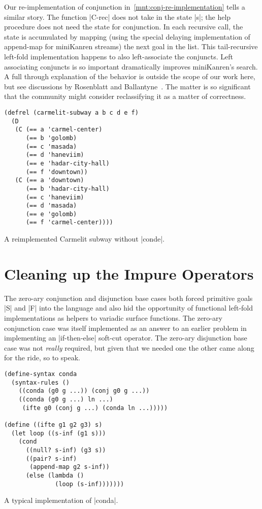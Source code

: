 \documentclass[sigplan,screen,draft,anonymous,review,natbib=false]{acmart}
\begin{document}
Our re-implementation of conjunction
in~\cref{mnt:conj-re-implementation} tells a similar story. The
function \rackinline|C-rec| does not take in the state \rackinline|s|;
the help procedure does not need the state for conjunction. In each
recursive call, the state is accumulated by mapping (using the special
delaying implementation of append-map for miniKanren streams) the next
goal in the list. This tail-recursive left-fold implementation happens
to also left-associate the conjuncts. Left associating conjuncts is so
important dramatically improves miniKanren's search. A full through
explanation of the behavior is outside the scope of our work here, but
see discussions by Rosenblatt and Ballantyne~\cite{here,nowhere}. The
matter is so significant that the community might consider
reclassifying it as a matter of correctness.

\begin{listing}
  \begin{verbatim}
(defrel (carmelit-subway a b c d e f)
  (D
   (C (== a 'carmel-center)
      (== b 'golomb)
      (== c 'masada)
      (== d 'haneviim)
      (== e 'hadar-city-hall)
      (== f 'downtown))
   (C (== a 'downtown)
      (== b 'hadar-city-hall)
      (== c 'haneviim)
      (== d 'masada)
      (== e 'golomb)
      (== f 'carmel-center))))
  \end{verbatim}
  \caption{A reimplemented Carmelit subway without \rackinline|conde|.}
  \label{mnt:new-carmelit}
\end{listing}



\section{Cleaning up the Impure Operators}\label{sec:impure}

The zero-ary conjunction and disjunction base cases both forced
primitive goals \rackinline|S| and \rackinline|F| into the language
and also hid the opportunity of functional left-fold implementations
as helpers to variadic surface functions. The zero-ary conjunction
case was itself implemented as an answer to an earlier problem in
implementing an \rackinline|if-then-else| soft-cut operator. The
zero-ary disjunction base case was not \emph{really} required, but
given that we needed one the other came along for the ride, so to
speak.

\begin{listing}
  \begin{verbatim}
(define-syntax conda
  (syntax-rules ()
    ((conda (g0 g ...)) (conj g0 g ...))
    ((conda (g0 g ...) ln ...)
     (ifte g0 (conj g ...) (conda ln ...)))))

(define ((ifte g1 g2 g3) s)
  (let loop ((s-inf (g1 s)))
    (cond
      ((null? s-inf) (g3 s))
      ((pair? s-inf)
       (append-map g2 s-inf))
      (else (lambda ()
              (loop (s-inf)))))))
  \end{verbatim}
  \caption{A typical implementation of \rackinline|conda|.}
  \label{mnt:conda-implementation}
\end{listing}
\end{document}
